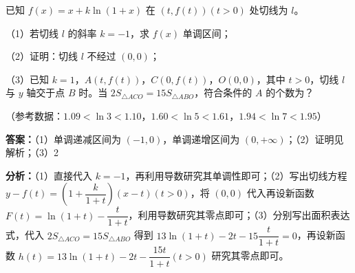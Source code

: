 \begin{question}[points=15]
已知 $f(x)=x+k\ln(1+x)$ 在 $(t,f(t))(t>0)$ 处切线为 $l$。

（1）若切线 $l$ 的斜率 $k=-1$，求 $f(x)$ 单调区间；

（2）证明：切线 $l$ 不经过 $(0,0)$；

（3）已知 $k=1$，$A(t,f(t))$，$C(0,f(t))$，$O(0,0)$，其中 $t>0$，切线 $l$ 与 $y$ 轴交于点 $B$ 时。当 $2S_{\triangle ACO}=15S_{\triangle ABO}$，符合条件的 $A$ 的个数为？

（参考数据：$1.09<\ln3<1.10$，$1.60<\ln5<1.61$，$1.94<\ln7<1.95$）
\begin{solution}
\textbf{答案：}（1）单调递减区间为 $(-1,0)$，单调递增区间为 $(0,+\infty)$；（2）证明见解析；（3）2

\textbf{分析：}（1）直接代入 $k=-1$，再利用导数研究其单调性即可；（2）写出切线方程 $y-f(t)=\left(1+\dfrac{k}{1+t}\right)(x-t)(t>0)$，将 $(0,0)$ 代入再设新函数 $F(t)=\ln(1+t)-\dfrac{t}{1+t}$，利用导数研究其零点即可；（3）分别写出面积表达式，代入 $2S_{\triangle ACO}=15S_{\triangle ABO}$ 得到 $13\ln(1+t)-2t-15\dfrac{t}{1+t}=0$，再设新函数 $h(t)=13\ln(1+t)-2t-\dfrac{15t}{1+t}(t>0)$ 研究其零点即可。


\end{solution}
\end{question}
